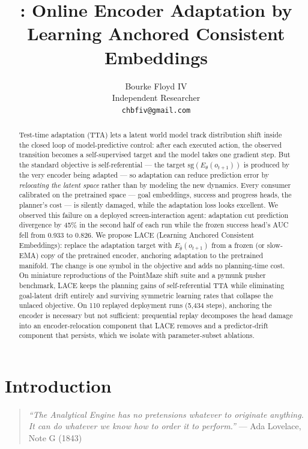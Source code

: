 \documentclass{article}
\title{\lovelace: Online Encoder Adaptation by\\
Learning Anchored Consistent Embeddings}
\author{%
  Bourke Floyd IV\\
  Independent Researcher\\
  \texttt{chbfiv@gmail.com}
}
\date{}
\newcommand{\lace}{\textsc{LACE}}
\newcommand{\sg}{\mathrm{sg}}
\newcommand{\Estud}{E_{\theta}}
\newcommand{\Efroz}{E_{\bar\theta}}
\begin{document}
\maketitle

\begin{abstract}
Test-time adaptation (TTA) lets a latent world model track distribution shift
inside the closed loop of model-predictive control: after each executed
action, the observed transition becomes a self-supervised target and the model
takes one gradient step. But the standard objective is self-referential --- the
target $\sg(\Estud(o_{t+1}))$ is produced by the very encoder being adapted ---
so adaptation can reduce prediction error by \emph{relocating the latent
space} rather than by modeling the new dynamics. Every consumer calibrated on
the pretrained space --- goal embeddings, success and progress heads, the
planner's cost --- is silently damaged, while the adaptation loss looks
excellent. We observed this failure on a deployed screen-interaction agent:
adaptation cut prediction divergence by 45\% in the second half of each run
while the frozen success head's AUC fell from 0.933 to 0.826. We propose
\lace{} (Learning Anchored Consistent Embeddings): replace the adaptation
target with $\Efroz(o_{t+1})$ from a frozen (or slow-EMA) copy of the
pretrained encoder, anchoring adaptation to the pretrained manifold. The
change is one symbol in the objective and adds no planning-time cost. On
miniature reproductions of the PointMaze shift suite and a pymunk pusher
benchmark, \lace{} keeps the planning gains of self-referential TTA while
eliminating goal-latent drift entirely and surviving symmetric learning rates
that collapse the unlaced objective. On 110 replayed deployment runs
(5{,}434 steps), anchoring the encoder is necessary but not sufficient:
prequential replay decomposes the head damage into an encoder-relocation
component that \lace{} removes and a predictor-drift component that persists,
which we isolate with parameter-subset ablations.
\end{abstract}

\section{Introduction}
\label{sec:intro}

\begin{quote}\small\emph{``The Analytical Engine has no pretensions whatever
to originate anything. It can do whatever we know how to order it to
perform.''} --- Ada Lovelace, Note G (1843)
\end{quote}
\end{document}
